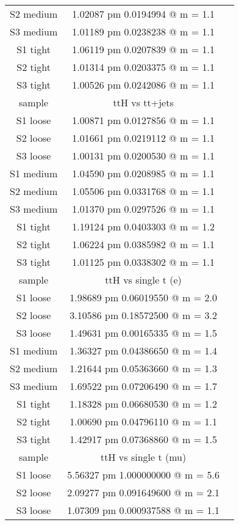 \documentclass[12pt,a4paper,twoside,english]{report}
\begin{document}
\begin{table}[h!]
\begin{tabular}{||c|c|c||}
    S2 medium & 1.02087 pm 0.0194994 @ m = 1.1\\
    S3 medium & 1.01189 pm 0.0238238 @ m = 1.1\\
    S1 tight  & 1.06119 pm 0.0207839 @ m = 1.1\\
    S2 tight  & 1.01314 pm 0.0203375 @ m = 1.1\\
    S3 tight  & 1.00526 pm 0.0242086 @ m = 1.1\\
    \hline
    \hline
    sample & ttH vs tt+jets\\
    \hline
    S1 loose  & 1.00871 pm 0.0127856 @ m = 1.1\\
    S2 loose  & 1.01661 pm 0.0219112 @ m = 1.1\\ 
    S3 loose  & 1.00131 pm 0.0200530 @ m = 1.1\\
    S1 medium & 1.04590 pm 0.0208985 @ m = 1.1\\
    S2 medium & 1.05506 pm 0.0331768 @ m = 1.1\\
    S3 medium & 1.01370 pm 0.0297526 @ m = 1.1\\
    S1 tight  & 1.19124 pm 0.0403303 @ m = 1.2\\
    S2 tight  & 1.06224 pm 0.0385982 @ m = 1.1\\
    S3 tight  & 1.01125 pm 0.0338302 @ m = 1.1\\
    \hline
    \hline
    sample & ttH vs single t (e)\\
    \hline
    S1 loose  & 1.98689 pm 0.06019550 @ m = 2.0\\
    S2 loose  & 3.10586 pm 0.18572500 @ m = 3.2\\ 
    S3 loose  & 1.49631 pm 0.00165335 @ m = 1.5\\
    S1 medium & 1.36327 pm 0.04386650 @ m = 1.4\\
    S2 medium & 1.21644 pm 0.05363660 @ m = 1.3\\
    S3 medium & 1.69522 pm 0.07206490 @ m = 1.7\\
    S1 tight  & 1.18328 pm 0.06680530 @ m = 1.2\\
    S2 tight  & 1.00690 pm 0.04796110 @ m = 1.1\\
    S3 tight  & 1.42917 pm 0.07368860 @ m = 1.5\\
    \hline
    \hline
    sample & ttH vs single t (mu)\\
    \hline
    S1 loose  & 5.56327 pm 1.000000000 @ m = 5.6\\
    S2 loose  & 2.09277 pm 0.091649600 @ m = 2.1\\ 
    S3 loose  & 1.07309 pm 0.000937588 @ m = 1.1\\

\end{tabular}
\end{table}
\end{document}
